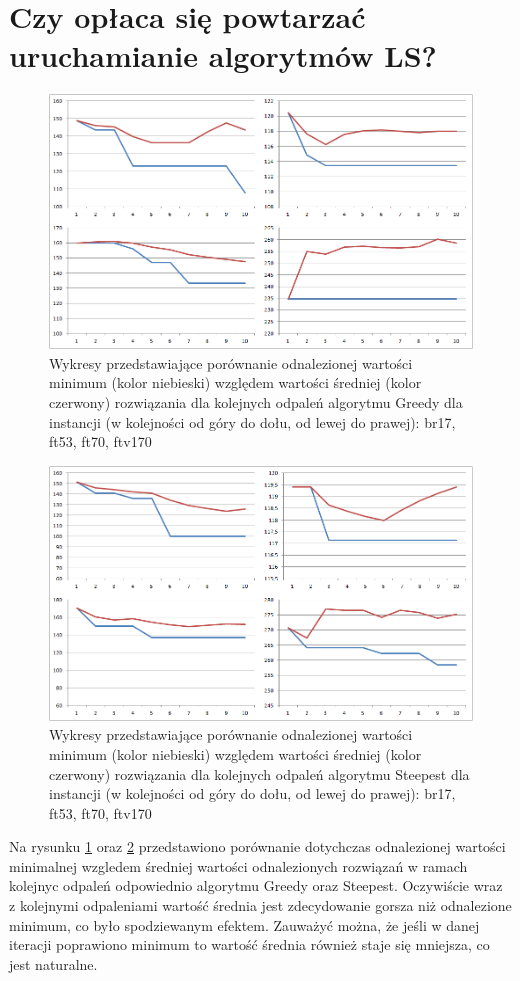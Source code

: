 \section{Czy opłaca się powtarzać uruchamianie algorytmów LS?}
\begin{figure}[!h]
\centering\includegraphics[width=12cm]{img/min_vs_avg_g.png}
\caption{Wykresy przedstawiające porównanie odnalezionej wartości minimum (kolor niebieski) względem wartości średniej (kolor czerwony) rozwiązania dla kolejnych odpaleń algorytmu Greedy dla instancji (w kolejności od góry do dołu, od lewej do prawej): br17, ft53, ft70, ftv170}\label{rys:mvsag}
\end{figure}
\begin{figure}[!h]
\centering\includegraphics[width=12cm]{img/min_vs_avg_s.png}
\caption{Wykresy przedstawiające porównanie odnalezionej wartości minimum (kolor niebieski) względem wartości średniej (kolor czerwony) rozwiązania dla kolejnych odpaleń algorytmu Steepest dla instancji (w kolejności od góry do dołu, od lewej do prawej): br17, ft53, ft70, ftv170}\label{rys:mvsas}
\end{figure}

Na rysunku \ref{rys:mvsag} oraz \ref{rys:mvsas} przedstawiono porównanie dotychczas odnalezionej wartości minimalnej wzgledem średniej wartości odnalezionych rozwiązań w ramach kolejnyc odpaleń odpowiednio algorytmu Greedy oraz Steepest. Oczywiście wraz z kolejnymi odpaleniami wartość średnia jest zdecydowanie gorsza niż odnalezione minimum, co było spodziewanym efektem. Zauważyć można, że jeśli w danej iteracji poprawiono minimum to wartość średnia również staje się mniejsza, co jest naturalne.

